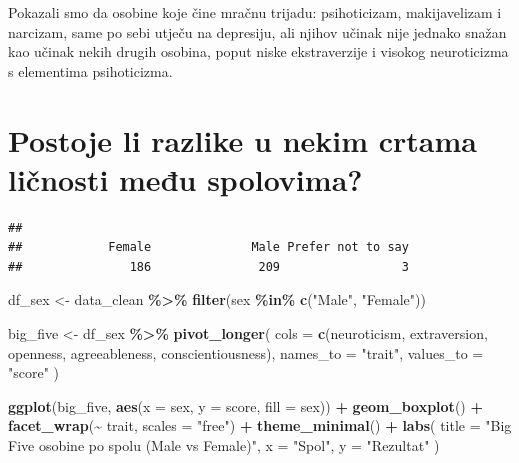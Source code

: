 \documentclass[
]{article}
\newenvironment{Shaded}{\begin{snugshade}}{\end{snugshade}}
\newcommand{\AttributeTok}[1]{\textcolor[rgb]{0.13,0.29,0.53}{#1}}
\newcommand{\FunctionTok}[1]{\textcolor[rgb]{0.13,0.29,0.53}{\textbf{#1}}}
\newcommand{\NormalTok}[1]{#1}
\newcommand{\OtherTok}[1]{\textcolor[rgb]{0.56,0.35,0.01}{#1}}
\newcommand{\SpecialCharTok}[1]{\textcolor[rgb]{0.81,0.36,0.00}{\textbf{#1}}}
\newcommand{\StringTok}[1]{\textcolor[rgb]{0.31,0.60,0.02}{#1}}
\begin{document}
Pokazali smo da osobine koje čine mračnu trijadu: psihoticizam,
makijavelizam i narcizam, same po sebi utječu na depresiju, ali njihov
učinak nije jednako snažan kao učinak nekih drugih osobina, poput niske
ekstraverzije i visokog neuroticizma s elementima psihoticizma.

\section{Postoje li razlike u nekim crtama ličnosti među
spolovima?}\label{postoje-li-razlike-u-nekim-crtama-liux10dnosti-meux111u-spolovima}

\begin{Shaded}
\end{Shaded}

\begin{verbatim}
## 
##            Female              Male Prefer not to say 
##               186               209                 3
\end{verbatim}

\begin{Shaded}
\begin{Highlighting}[]
\NormalTok{df\_sex }\OtherTok{\textless{}{-}}\NormalTok{ data\_clean }\SpecialCharTok{\%\textgreater{}\%}
  \FunctionTok{filter}\NormalTok{(sex }\SpecialCharTok{\%in\%} \FunctionTok{c}\NormalTok{(}\StringTok{"Male"}\NormalTok{, }\StringTok{"Female"}\NormalTok{))}
\end{Highlighting}
\end{Shaded}

\begin{Shaded}
\begin{Highlighting}[]
\NormalTok{big\_five }\OtherTok{\textless{}{-}}\NormalTok{ df\_sex }\SpecialCharTok{\%\textgreater{}\%}
  \FunctionTok{pivot\_longer}\NormalTok{(}
    \AttributeTok{cols =} \FunctionTok{c}\NormalTok{(neuroticism, extraversion, openness, agreeableness, conscientiousness),}
    \AttributeTok{names\_to =} \StringTok{"trait"}\NormalTok{,}
    \AttributeTok{values\_to =} \StringTok{"score"}
\NormalTok{  )}

\FunctionTok{ggplot}\NormalTok{(big\_five, }\FunctionTok{aes}\NormalTok{(}\AttributeTok{x =}\NormalTok{ sex, }\AttributeTok{y =}\NormalTok{ score, }\AttributeTok{fill =}\NormalTok{ sex)) }\SpecialCharTok{+}
  \FunctionTok{geom\_boxplot}\NormalTok{() }\SpecialCharTok{+}
  \FunctionTok{facet\_wrap}\NormalTok{(}\SpecialCharTok{\textasciitilde{}}\NormalTok{ trait, }\AttributeTok{scales =} \StringTok{"free"}\NormalTok{) }\SpecialCharTok{+}
  \FunctionTok{theme\_minimal}\NormalTok{() }\SpecialCharTok{+}
  \FunctionTok{labs}\NormalTok{(}
    \AttributeTok{title =} \StringTok{"Big Five osobine po spolu (Male vs Female)"}\NormalTok{,}
    \AttributeTok{x =} \StringTok{"Spol"}\NormalTok{,}
    \AttributeTok{y =} \StringTok{"Rezultat"}
\NormalTok{  )}
\end{Highlighting}
\end{Shaded}
\end{document}
